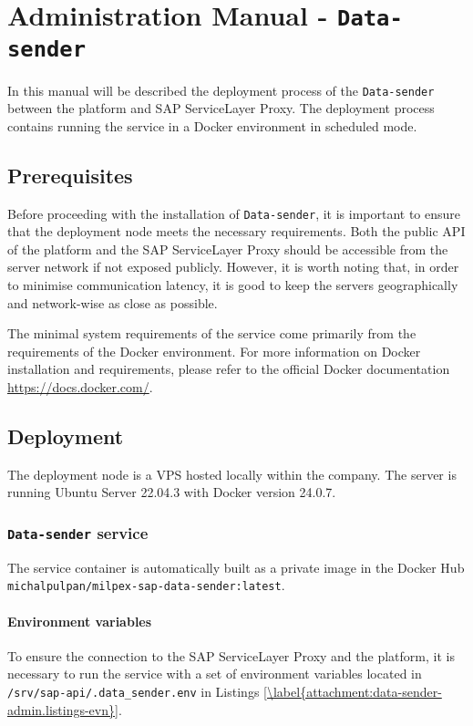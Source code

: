 \chapter{Administration Manual - \texttt{Data-sender}}
\label{attachments:admin-manual-data-sender}

In this manual will be described the deployment process of the \texttt{Data-sender} between the platform and SAP ServiceLayer Proxy.
The deployment process contains running the service in a Docker environment in scheduled mode.

\section{Prerequisites}
Before proceeding with the installation of \texttt{Data-sender}, it is important to ensure that the deployment node meets the necessary requirements.
Both the public API of the platform and the SAP ServiceLayer Proxy should be accessible from the server network if not exposed publicly.
However, it is worth noting that, in order to minimise communication latency, it is good to keep the servers geographically and network-wise as close as possible. 

The minimal system requirements of the service come primarily from the requirements of the Docker environment.
For more information on Docker installation and requirements, please refer to the official Docker documentation \url{https://docs.docker.com/}.

\section{Deployment}
\label{sec:admin-manual-sap.deployment}
The deployment node is a \ac{VPS} hosted locally within the company.
The server is running Ubuntu Server 22.04.3 with Docker version 24.0.7.

\subsection{\texttt{Data-sender} service}
The service container is automatically built as a private image in the Docker Hub \texttt{michalpulpan/milpex-sap-data-sender:latest}.

\subsubsection{Environment variables}
To ensure the connection to the SAP ServiceLayer Proxy and the platform, it is necessary to run the service with a set of environment variables located in \texttt{/srv/sap-api/.data\_sender.env} in Listings \ref{\label{attachment:data-sender-admin.listings-evn}}.

